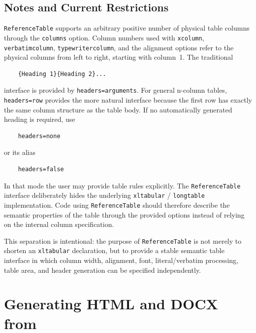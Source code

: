 \documentclass[
11pt,
a4paper,
oneside
]{scrbook}
\begin{document}
{%
\section{Notes and Current Restrictions}

\texttt{ReferenceTable} supports an arbitrary positive number of physical
table columns through the \texttt{columns} option.
Column numbers used with \texttt{xcolumn}, \texttt{verbatimcolumn},
\texttt{typewritercolumn}, and the alignment options refer to the physical
columns from left to right, starting with column~1.
The traditional
\begin{verbatim}
	{Heading 1}{Heading 2}...
\end{verbatim}
interface is provided by \texttt{headers=arguments}. For general n-column
tables, \texttt{headers=row} provides the more natural interface because the
first row has exactly the same column structure as the table body.
If no automatically generated heading is required, use
\begin{verbatim}
	headers=none
\end{verbatim}
or its alias
\begin{verbatim}
	headers=false
\end{verbatim}
In that mode the user may provide table rules explicitly.
The \texttt{ReferenceTable} interface deliberately hides the underlying
\texttt{xltabular} / \texttt{longtable} implementation. Code using
\texttt{ReferenceTable} should therefore describe the semantic properties of
the table through the provided options instead of relying on the internal
column specification.

This separation is intentional: the purpose of \texttt{ReferenceTable} is
not merely to shorten an \texttt{xltabular} declaration, but to provide a
stable semantic table interface in which column width, alignment, font,
literal/verbatim processing, table area, and header generation can be
specified independently.

\chapter{Generating HTML and DOCX from \mdlayout{}}
\label{chap:HTMLGeneration}

}
\end{document}
